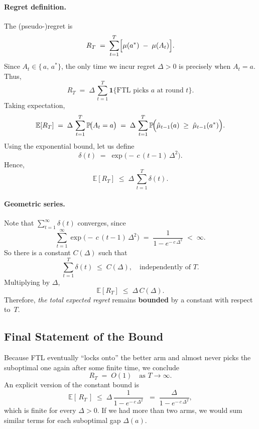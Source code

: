 \paragraph{Regret definition.}
The (pseudo-)regret is
\[
  R_T
  \;=\;
  \sum_{t=1}^T
  \Bigl[\mu(a^*) \;-\;\mu(A_t)\Bigr].
\]
Since $A_t \in \{\,a,\,a^*\!\}$, the only time we incur regret $\Delta>0$ is precisely when $A_t=a$.  Thus,
\[
  R_T
  \;=\;
  \Delta \,\sum_{t=1}^T \mathbf{1}\{\text{FTL picks $a$ at round $t$}\}.
\]
Taking expectation,
\[
  \mathbb{E}[R_T]
  \;=\;
  \Delta \,\sum_{t=1}^T
  \mathbb{P}\!\bigl(A_t = a\bigr)
  \;=\;
  \Delta \,\sum_{t=1}^T
  \mathbb{P}\!\Bigl(\hat{\mu}_{t-1}(a)\;\ge\;\hat{\mu}_{t-1}(a^*)\Bigr).
\]
Using the exponential bound, let us define
\[
  \delta(t)
  \;=\;
  \exp\bigl(-\,c\,(t-1)\,\Delta^2\bigr).
\]
Hence,
\[
  \mathbb{E}[R_T]
  \;\le\;
  \Delta \,\sum_{t=1}^T \delta(t).
\]

\paragraph{Geometric series.}
Note that $\sum_{t=1}^\infty \delta(t)$ converges, since
\[
  \sum_{t=1}^\infty
  \exp\bigl(-\,c\,(t-1)\,\Delta^2\bigr)
  \;=\;
  \frac{1}{1 - e^{-\,c\,\Delta^2}}
  \;<\;\infty.
\]
So there is a constant $C(\Delta)$ such that
\[
  \sum_{t=1}^T
  \delta(t)
  \;\le\;
  C(\Delta),
  \quad
  \text{independently of $T$.}
\]
Multiplying by $\Delta$,
\[
  \mathbb{E}[R_T]
  \;\le\;
  \Delta \,C(\Delta).
\]
Therefore, \emph{the total expected regret} remains \textbf{bounded} by a constant with respect to~$T$.

\subsection*{Final Statement of the Bound}

Because FTL eventually ``locks onto'' the better arm and almost never picks the suboptimal one again after some finite time, we conclude
\[
  R_T
  \;=\;
  O(1)
  \quad\text{as }T\to\infty.
\]
An explicit version of the constant bound is
\[
  \mathbb{E}[\,R_T\,]
  \;\le\;
  \Delta
  \,\frac{1}{1 - e^{-\,c\,\Delta^2}}
  \;\;=\;
  \frac{\Delta}{1 - e^{-\,c\,\Delta^2}},
\]
which is finite for every $\Delta>0$.  If we had more than two arms, we would sum similar terms for each suboptimal gap $\Delta(a)$.